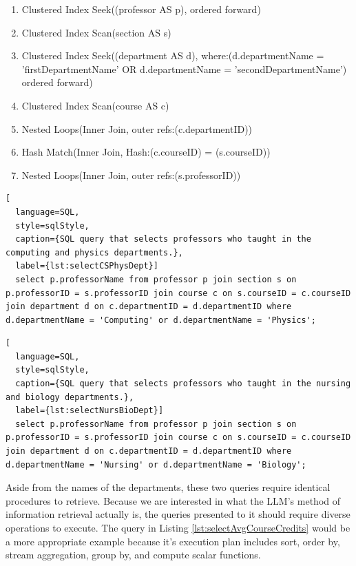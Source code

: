 \begin{enumerate}
  \raggedright
  \item Clustered Index Seek((professor AS p), ordered forward)
  \item Clustered Index Scan(section AS s)
  \item Clustered Index Seek((department AS d),  where:(d.departmentName = 'firstDepartmentName' OR d.departmentName = 'secondDepartmentName') ordered forward)
  \item Clustered Index Scan(course AS c)
  \item Nested Loops(Inner Join, outer refs:(c.departmentID))
  \item Hash Match(Inner Join, Hash:(c.courseID) = (s.courseID))
  \item Nested Loops(Inner Join, outer refs:(s.professorID))
\end{enumerate}

\begin{lstlisting}[
  language=SQL,
  style=sqlStyle,
  caption={SQL query that selects professors who taught in the computing and physics departments.},
  label={lst:selectCSPhysDept}]
  select p.professorName from professor p join section s on p.professorID = s.professorID join course c on s.courseID = c.courseID join department d on c.departmentID = d.departmentID where d.departmentName = 'Computing' or d.departmentName = 'Physics';
\end{lstlisting}

\begin{lstlisting}[
  language=SQL,
  style=sqlStyle,
  caption={SQL query that selects professors who taught in the nursing and biology departments.},
  label={lst:selectNursBioDept}]
  select p.professorName from professor p join section s on p.professorID = s.professorID join course c on s.courseID = c.courseID join department d on c.departmentID = d.departmentID where d.departmentName = 'Nursing' or d.departmentName = 'Biology';
\end{lstlisting}

Aside from the names of the departments, these two queries require identical procedures to retrieve. Because we are interested in what the LLM's method of information retrieval actually is, the queries presented to it should require diverse operations to execute. The query in Listing \ref{lst:selectAvgCourseCredits} would be a more appropriate example because it's execution plan includes sort, order by, stream aggregation, group by, and compute scalar functions.


